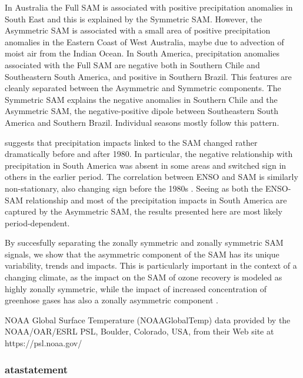 \documentclass[smallextended]{svjour3}       %
\begin{document}
In Australia the Full SAM is associated with positive precipitation anomalies in South East and this is explained by the Symmetric SAM. However, the Asymmetric SAM is associated with a small area of positive precipitation anomalies in the Eastern Coast of West Australia, maybe due to advection of moist air from the Indian Ocean. In South America, precipitation anomalies associated with the Full SAM are negative both in Southern Chile and Southeastern South America, and positive in Southern Brazil. This features are cleanly separated between the Asymmetric and Symmetric components. The Symmetric SAM explains the negative anomalies in Southern Chile and the Asymmetric SAM, the negative-positive dipole between Southeastern South America and Southern Brazil. Individual seasons mostly follow this pattern.

\citet{silvestri2009} suggests that precipitation impacts linked to the SAM changed rather dramatically before and after 1980. In particular, the negative relationship with precipitation in South America was absent in some areas and switched sign in others in the earlier period. The correlation between ENSO and SAM is similarly non-stationary, also changing sign before the 1980s \citep{fogt2006, clem2013}. Seeing as both the ENSO-SAM relationship and most of the precipitation impacts in South America are captured by the Asymmetric SAM, the results presented here are most likely period-dependent.

By succesfully separating the zonally symmetric and zonally symmetric SAM signals, we show that the asymmetric component of the SAM has its unique variability, trends and impacts. This is particularly important in the context of a changing climate, as the impact on the SAM of ozone recovery is modeled as highly zonally symmetric, while the impact of increased concentration of greenhose gases has also a zonally asymmetric component \citep{arblaster2006, simpkins2012}.

\begin{acknowledgements}
NOAA Global Surface Temperature (NOAAGlobalTemp) data provided by the NOAA/OAR/ESRL PSL, Boulder, Colorado, USA, from their Web site at https://psl.noaa.gov/ 
\end{acknowledgements}

\hypertarget{atastatement}{%
\subsubsection{atastatement}\label{atastatement}}
\end{document}
